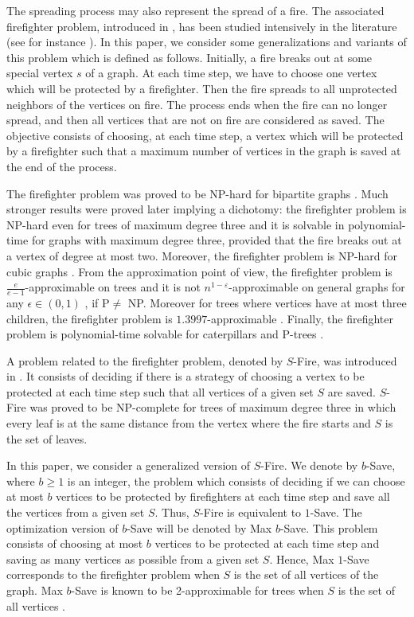 \documentclass[10pt]{article}
\begin{document}
The spreading process may also represent the spread of a fire. The associated firefighter problem, introduced in \cite{hartnell1995}, 
has been studied intensively in the literature (see for instance \cite{anshelevich2009,cai2008,develin2007,finbow2007,finbow2009,hartnell1995,hartnell2000,IKM11,king2010,macgillivray2003,ng2008}). In this paper, 
we consider some generalizations and variants of this problem which is defined as follows.
Initially, a fire breaks out at some special
vertex $s$ of a graph. At each time step, we have to choose one
vertex which will be protected by a firefighter. Then the fire
spreads to all unprotected neighbors of the vertices on fire. The
process ends when the fire can no longer spread, and then all
vertices that are not on fire are considered as saved. The
objective consists of choosing, at each time step, a vertex which
will be protected by a firefighter such that a maximum number of
vertices in the graph is saved at the end of the process. 

The firefighter problem
was proved to be NP-hard for bipartite graphs
\cite{macgillivray2003}. Much stronger results were proved later
\cite{finbow2007} implying a dichotomy: the firefighter problem is
NP-hard even for trees of maximum degree three and it is solvable
in polynomial-time for graphs with maximum degree three, provided
that the fire breaks out at a vertex of degree at most two.
Moreover, the firefighter problem is NP-hard for cubic graphs
\cite{king2010}. From the approximation point of view, the
firefighter problem is $\frac{e}{e-1}$-approximable on trees \cite{cai2008} and
it is not $n^{1-\varepsilon}$-approximable on general graphs for any $\epsilon \in (0,1)$
\cite{anshelevich2009}, if P$\neq$ NP. Moreover for trees where vertices have at most three children, 
the firefighter problem is $1.3997$-approximable \cite{IKM11}. Finally, the firefighter problem is polynomial-time solvable for caterpillars and P-trees \cite{macgillivray2003}.

A problem related to the firefighter
problem, denoted by {\sc $S$-Fire}, was introduced in
\cite{king2010}. It consists of deciding if there is a strategy
of choosing a vertex to be protected at each time step such that  all vertices
of a given set $S$ are saved. {\sc $S$-Fire} was proved to be
NP-complete for trees of maximum degree three in which every leaf is
at the same distance from the vertex where the fire starts and $S$ is the set of leaves.

In this paper, we consider a generalized version of {\sc
$S$-Fire}. We denote by {\sc $b$-Save}, where $b \geq 1$ is an integer,
the problem which consists of deciding if we can choose at most $b$ vertices
to be protected by firefighters at each time step and save all the vertices
from a given set $S$. Thus, {\sc $S$-Fire} is equivalent to {\sc $1$-Save}.
The optimization version of {\sc $b$-Save} will be denoted by {\sc Max $b$-Save}.
This problem consists of choosing at most $b$ vertices to be protected at each time
step and saving as many vertices as possible from a given set $S$. Hence, {\sc Max $1$-Save}
corresponds to the firefighter problem when $S$ is the set of all vertices of the graph.
{\sc Max $b$-Save} is known to be 2-approximable for trees  when $S$ is the
set of all vertices \cite{hartnell2000}. 
\end{document}

